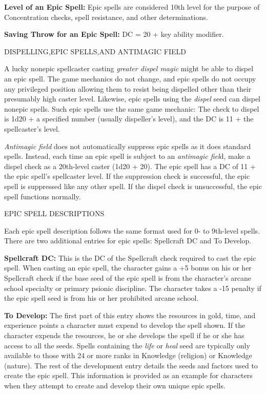 \documentclass{article}
\begin{document}
\textbf{Level of an Epic Spell: }Epic spells are considered 10th level for the 
purpose of Concentration checks, spell resistance, and other determinations. 

\textbf{Saving Throw for an Epic Spell: }DC = 20 + key ability modifier. 

\vspace{12pt}
DISPELLING,EPIC SPELLS,AND ANTIMAGIC FIELD

A lucky nonepic spellcaster casting \textit{greater dispel magic }might be able 
to dispel an epic spell. The game mechanics do not change, and epic spells do not 
occupy any privileged position allowing them to resist being dispelled other than 
their presumably high caster level. Likewise, epic spells using the \textit{dispel 
}seed can dispel nonepic spells. Such epic spells use the same game mechanic: The 
check to dispel is 1d20 + a specified number (usually dispeller's level), and the 
DC is 11 + the spellcaster's level. 

\textit{Antimagic field }does not automatically suppress epic spells as it does 
standard spells. Instead, each time an epic spell is subject to an \textit{antimagic 
fiel}d, make a dispel check as a 20th-level caster (1d20 + 20). The epic spell 
has a DC of 11 + the epic spell's spellcaster level. If the suppression check is 
successful, the epic spell is suppressed like any other spell. If the dispel check 
is unsuccessful, the epic spell functions normally.

\vspace{12pt}
EPIC SPELL DESCRIPTIONS

Each epic spell description follows the same format used for 0- to 9th-level spells\textit{. 
}There are two additional entries for epic spells: Spellcraft DC and To Develop. 

\textbf{Spellcraft DC:} This is the DC of the Spellcraft check required to cast 
the epic spell. When casting an epic spell, the character gains a +5 bonus on his 
or her Spellcraft check if the base seed of the epic spell is from the character's 
arcane school specialty or primary psionic discipline. The character takes a -15 
penalty if the epic spell seed is from his or her prohibited arcane school.

\textbf{To Develop:} The first part of this entry shows the resources in gold, 
time, and experience points a character must expend to develop the spell shown. 
If the character expends the resources, he or she develops the spell if he or she 
has access to all the seeds. Spells containing the \textit{life }or \textit{heal 
}seed are typically only available to those with 24 or more ranks in Knowledge 
(religion) or Knowledge (nature). The rest of the development entry details the 
seeds and factors used to create the epic spell. This information is provided as 
an example for characters when they attempt to create and develop their own unique 
epic spells. 
\end{document}
